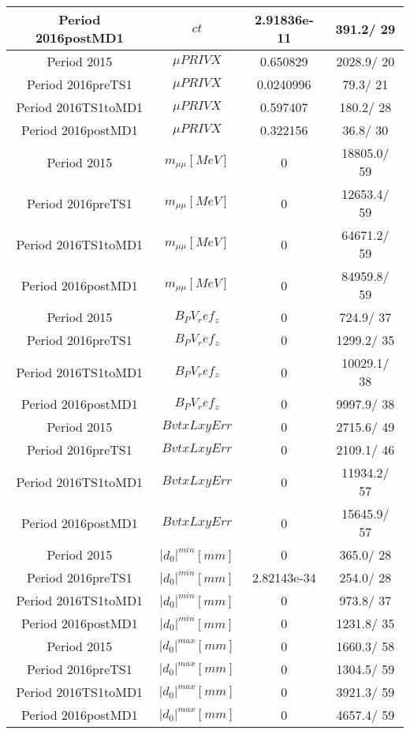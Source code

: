 \documentclass{article}
\begin{document}
\begin{longtable}{c|c|c|c}
\hline
 Period 2016postMD1 & $ct$ & 2.91836e-11 & 391.2/ 29\\
\hline
 Period 2015 & $\mu PRIVX$ & 0.650829 & 2028.9/ 20\\
\hline
 Period 2016preTS1 & $\mu PRIVX$ & 0.0240996 &  79.3/ 21\\
\hline
 Period 2016TS1toMD1 & $\mu PRIVX$ & 0.597407 & 180.2/ 28\\
\hline
 Period 2016postMD1 & $\mu PRIVX$ & 0.322156 &  36.8/ 30\\
\hline
 Period 2015 & $m_{\mu\mu} [MeV]$ & 0 & 18805.0/ 59\\
\hline
 Period 2016preTS1 & $m_{\mu\mu} [MeV]$ & 0 & 12653.4/ 59\\
\hline
 Period 2016TS1toMD1 & $m_{\mu\mu} [MeV]$ & 0 & 64671.2/ 59\\
\hline
 Period 2016postMD1 & $m_{\mu\mu} [MeV]$ & 0 & 84959.8/ 59\\
\hline
 Period 2015 & $B_PV_ref_z$ & 0 & 724.9/ 37\\
\hline
 Period 2016preTS1 & $B_PV_ref_z$ & 0 & 1299.2/ 35\\
\hline
 Period 2016TS1toMD1 & $B_PV_ref_z$ & 0 & 10029.1/ 38\\
\hline
 Period 2016postMD1 & $B_PV_ref_z$ & 0 & 9997.9/ 38\\
\hline
 Period 2015 & $BvtxLxyErr$ & 0 & 2715.6/ 49\\
\hline
 Period 2016preTS1 & $BvtxLxyErr$ & 0 & 2109.1/ 46\\
\hline
 Period 2016TS1toMD1 & $BvtxLxyErr$ & 0 & 11934.2/ 57\\
\hline
 Period 2016postMD1 & $BvtxLxyErr$ & 0 & 15645.9/ 57\\
\hline
 Period 2015 & $|d_{0}|^{min} [mm]$ & 0 & 365.0/ 28\\
\hline
 Period 2016preTS1 & $|d_{0}|^{min} [mm]$ & 2.82143e-34 & 254.0/ 28\\
\hline
 Period 2016TS1toMD1 & $|d_{0}|^{min} [mm]$ & 0 & 973.8/ 37\\
\hline
 Period 2016postMD1 & $|d_{0}|^{min} [mm]$ & 0 & 1231.8/ 35\\
\hline
 Period 2015 & $|d_{0}|^{max} [mm]$ & 0 & 1660.3/ 58\\
\hline
 Period 2016preTS1 & $|d_{0}|^{max} [mm]$ & 0 & 1304.5/ 59\\
\hline
 Period 2016TS1toMD1 & $|d_{0}|^{max} [mm]$ & 0 & 3921.3/ 59\\
\hline
 Period 2016postMD1 & $|d_{0}|^{max} [mm]$ & 0 & 4657.4/ 59\\

\end{longtable}
\end{document}
